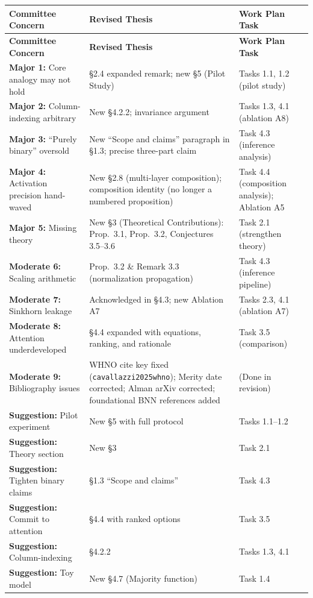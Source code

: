 \documentclass[12pt,a4paper]{article}
\begin{document}
\begin{center}
\small
\begin{longtable}{p{} p{} p{}}
\toprule
\textbf{Committee Concern} & \textbf{Revised Thesis} & \textbf{Work Plan Task} \\
\midrule
\endfirsthead
\toprule
\textbf{Committee Concern} & \textbf{Revised Thesis} & \textbf{Work Plan Task} \\
\midrule
\endhead
\textbf{Major 1:} Core analogy may not hold & \S2.4 expanded remark; new \S5 (Pilot Study) & Tasks 1.1, 1.2 (pilot study) \\
\midrule
\textbf{Major 2:} Column-indexing arbitrary & New \S4.2.2; invariance argument & Tasks 1.3, 4.1 (ablation A8) \\
\midrule
\textbf{Major 3:} ``Purely binary'' oversold & New ``Scope and claims'' paragraph in \S1.3; precise three-part claim & Task 4.3 (inference analysis) \\
\midrule
\textbf{Major 4:} Activation precision hand-waved & New \S2.8 (multi-layer composition); composition identity (no longer a numbered proposition) & Task 4.4 (composition analysis); Ablation A5 \\
\midrule
\textbf{Major 5:} Missing theory & New \S3 (Theoretical Contributions): Prop.~3.1, Prop.~3.2, Conjectures 3.5--3.6 & Task 2.1 (strengthen theory) \\
\midrule
\textbf{Moderate 6:} Scaling arithmetic & Prop.~3.2 \& Remark 3.3 (normalization propagation) & Task 4.3 (inference pipeline) \\
\midrule
\textbf{Moderate 7:} Sinkhorn leakage & Acknowledged in \S4.3; new Ablation A7 & Tasks 2.3, 4.1 (ablation A7) \\
\midrule
\textbf{Moderate 8:} Attention underdeveloped & \S4.4 expanded with equations, ranking, and rationale & Task 3.5 (comparison) \\
\midrule
\textbf{Moderate 9:} Bibliography issues & WHNO cite key fixed (\texttt{cavallazzi2025whno}); Merity date corrected; Alman arXiv corrected; foundational BNN references added & (Done in revision) \\
\midrule
\textbf{Suggestion:} Pilot experiment & New \S5 with full protocol & Tasks 1.1--1.2 \\
\midrule
\textbf{Suggestion:} Theory section & New \S3 & Task 2.1 \\
\midrule
\textbf{Suggestion:} Tighten binary claims & \S1.3 ``Scope and claims'' & Task 4.3 \\
\midrule
\textbf{Suggestion:} Commit to attention & \S4.4 with ranked options & Task 3.5 \\
\midrule
\textbf{Suggestion:} Column-indexing & \S4.2.2 & Tasks 1.3, 4.1 \\
\midrule
\textbf{Suggestion:} Toy model & New \S4.7 (Majority function) & Task 1.4 \\
\bottomrule
\end{longtable}
\end{center}
\end{document}
